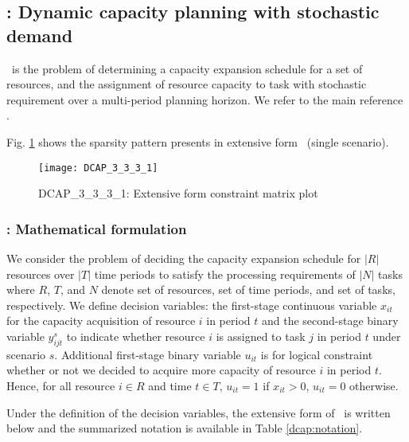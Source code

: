 \subsection{\dcap: Dynamic capacity planning with stochastic demand} \label{DCAP}
\dcap\ is the problem of determining a capacity expansion schedule for a set of resources, and the assignment of resource capacity to task with stochastic requirement over a multi-period planning horizon. We refer to the main reference \cite{journal:AG2004}.

Fig. \ref{fig:dcap_sparsity} shows the sparsity pattern presents in extensive form \dcap\ (single scenario).
\begin{figure}[H]
	\centering
	\texttt{[image: DCAP\_3\_3\_3\_1]}
	\caption{DCAP\_3\_3\_3\_1: Extensive form constraint matrix plot}
	\label{fig:dcap_sparsity}
\end{figure}

\subsubsection{\dcap: Mathematical formulation}
We consider the problem of deciding the capacity expansion schedule for $|R|$ resources over $|T|$ time periods to satisfy the processing requirements of $|N|$ tasks where $R$, $T$, and $N$ denote set of resources, set of time periods, and set of tasks, respectively. We define decision variables: the first-stage continuous variable $x_{it}$ for the capacity acquisition of resource $i$ in period $t$ and the second-stage binary variable $y_{ijt}^s$ to indicate whether resource $i$ is assigned to task $j$ in period $t$ under scenario $s$. Additional first-stage binary variable $u_{it}$ is for logical constraint whether or not we decided to acquire more capacity of resource $i$ in period $t$. Hence, for all resource $i\in R$ and time $t\in T$, $u_{it}=1$ if $x_{it}>0$, $u_{it}=0$ otherwise. 

Under the definition of the decision variables, the extensive form of \dcap\ is written below and the summarized notation is available in Table \ref{dcap:notation}.

